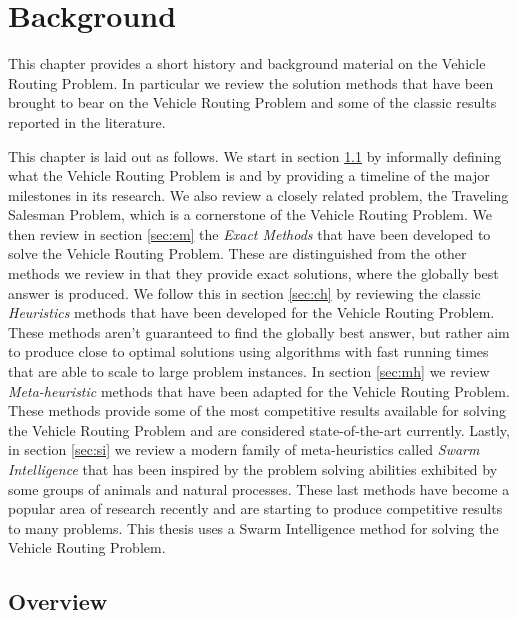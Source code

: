 
\chapter{Background}
\label{chap:background}

This chapter provides a short history and background material on the Vehicle Routing Problem. In particular we review the solution methods that have been brought to bear on the Vehicle Routing Problem and some of the classic results reported in the literature. 

This chapter is laid out as follows. We start in section \ref{sec:vo} by informally defining what the Vehicle Routing Problem is and by providing a timeline of the major milestones in its research. We also review a closely related problem, the Traveling Salesman Problem, which is a cornerstone of the Vehicle Routing Problem. We then review in section \ref{sec:em} the \emph{Exact Methods} that have been developed to solve the Vehicle Routing Problem. These are distinguished from the other methods we review in that they provide exact solutions, where the globally best answer is produced. We follow this in section \ref{sec:ch} by reviewing the classic \emph{Heuristics} methods that have been developed for the Vehicle Routing Problem. These methods aren't guaranteed to find the globally best answer, but rather aim to produce close to optimal solutions using algorithms with fast running times that are able to scale to large problem instances. In section \ref{sec:mh} we review \emph{Meta-heuristic} methods that have been adapted for the Vehicle Routing Problem. These methods provide some of the most competitive results available for solving the Vehicle Routing Problem and are considered state-of-the-art currently. Lastly, in section \ref{sec:si} we review a modern family of meta-heuristics called \emph{Swarm Intelligence} that has been inspired by the problem solving abilities exhibited by some groups of animals and natural processes. These last methods have become a popular area of research recently and are starting to produce competitive results to many problems. This thesis uses a Swarm Intelligence method for solving the Vehicle Routing Problem.


\section{Overview}
\label{sec:vo}

